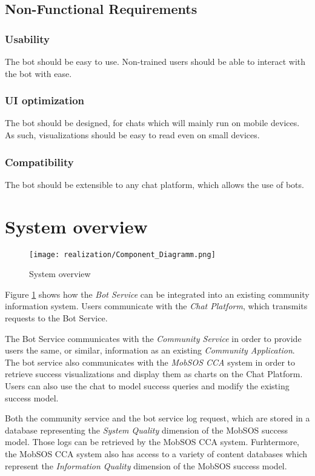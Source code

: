 \subsection{Non-Functional Requirements}

\subsubsection{Usability} The bot should be easy to use. Non-trained users should be able to interact with the bot with ease.

\subsubsection{UI optimization} The bot should be designed, for chats which will mainly run on mobile devices. As such, visualizations should be easy to read even on small devices.

\subsubsection{Compatibility} The bot should be extensible to any chat platform, which allows the use of bots.

\section{System overview}


\begin{figure}[h]
    \centering
    \texttt{[image: realization/Component\_Diagramm.png]}
    \caption{System overview}
    \label{fig:sytsemOverview}
\end{figure}

Figure \ref{fig:sytsemOverview} shows how the \emph{Bot Service} can be integrated into an existing community information system. Users communicate with the \emph{Chat Platform}, which transmits requests to the Bot Service.

The Bot Service communicates with the \emph{Community Service} in order to provide users the same, or similar, information as an existing \emph{Community Application}. The bot service also communicates with the \emph{MobSOS CCA} system in order to retrieve success visualizations and display them as charts on the Chat Platform. Users can also use the chat to model success queries and modify the existing success model.

Both the community service and the bot service log request, which are stored in a database representing the \emph{System Quality} dimension of the MobSOS success model. Those logs can be retrieved by the MobSOS CCA system. Furhtermore, the MobSOS CCA system also has access to a variety of content databases which represent the \emph{Information Quality} dimension of the MobSOS success model.